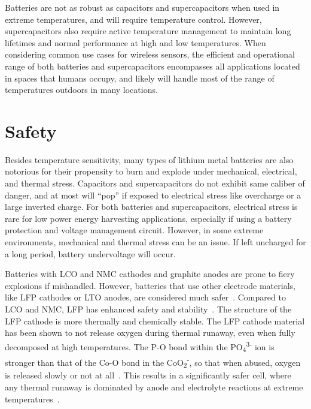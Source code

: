 Batteries are not as robust as capacitors and supercapacitors when used in extreme temperatures, and will require temperature control. However, 
supercapacitors also require active temperature management to maintain long lifetimes and normal performance at high and low temperatures. 
When considering common use cases for wireless sensors, the efficient and operational range of both batteries and supercapacitors encompasses all applications located in spaces that humans occupy, and likely will handle most of the range of temperatures outdoors in many locations.

\section{Safety} 
Besides temperature sensitivity, many types of lithium metal batteries are also notorious for their propensity to burn and explode under mechanical, electrical, and thermal stress.
Capacitors and supercapacitors do not exhibit same caliber of danger, and at most will ``pop'' if exposed to electrical stress like overcharge or a large inverted charge. 
For both batteries and supercapacitors, electrical stress is rare for low power energy harvesting applications, especially if using a battery protection and voltage management circuit. However, in some extreme environments, mechanical and thermal stress can be an issue. If left uncharged for a long period, battery undervoltage will occur. 

Batteries with LCO and NMC cathodes and graphite anodes are prone to fiery explosions if mishandled. However, 
batteries that use other electrode materials, like LFP cathodes or LTO anodes, are considered much safer~\cite{doughty2012general,nitta2015li,belharouakElectrochemistry11,larssonAbuse14}.
Compared to LCO and NMC, LFP has enhanced safety and stability~\cite{larssonAbuse14}. The structure of the LFP cathode is more thermally and chemically stable.  
The LFP cathode material has been shown to not release oxygen during thermal runaway, even when fully decomposed at high temperatures. 
The P-O bond within the PO\textsubscript{4}\textsuperscript{3-} ion is stronger than that of the Co-O bond in the CoO\textsubscript{2}\textsuperscript{-}, so that when abused, oxygen is released slowly or not at all~\cite{nitta2015li}.
This results in a significantly safer cell, where any thermal runaway is dominated by anode and electrolyte reactions at extreme temperatures~\cite{doughty2012general}.

